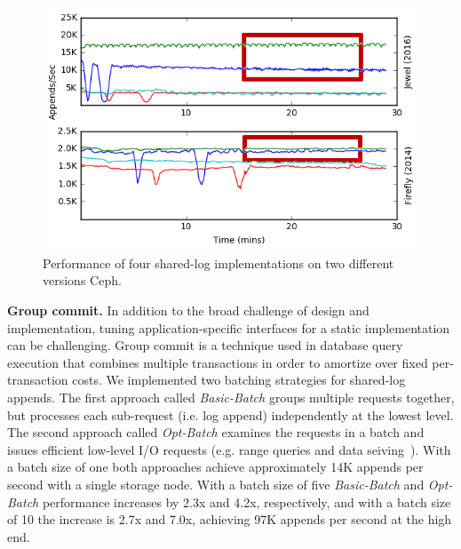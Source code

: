 \begin{figure}
    \centering
    \includegraphics[width=1.0\linewidth]{jewel_v_firefly_pd.png}
    \caption{Performance of four shared-log implementations on two different
    versions Ceph.}
    \label{fig:phy-design}
\end{figure}

{\bf Group commit.} In addition to the broad challenge of design and
implementation, tuning application-specific interfaces for a static
implementation can be challenging.  Group commit is a technique used in
database query execution that combines multiple transactions in order to
amortize over fixed per-transaction costs. We implemented two
batching strategies for shared-log appends. The first approach called
\emph{Basic-Batch} groups multiple requests together, but processes each
sub-request (i.e. log append) independently at the lowest level.
The second approach called \emph{Opt-Batch} examines the requests in a batch
and issues efficient low-level I/O requests (e.g. range queries and
data seiving~\cite{750599}). With a batch size of one both approaches achieve
approximately 14K appends per second with a single storage node. With a batch size of five
\emph{Basic-Batch} and \emph{Opt-Batch} performance increases by 2.3x and 4.2x,
respectively, and with a batch size of 10 the increase is 2.7x and 7.0x, achieving
97K appends per second at the high end.

